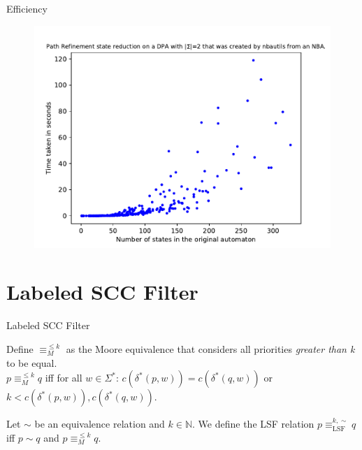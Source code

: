 \begin{frame}{Efficiency}
\begin{figure}
	\centering
	\includegraphics[page=6,height=.8\textheight]{../data/analysis/path_refinement/detnbaut_ap1.pdf} 
\end{figure}
\end{frame}





\section{Labeled SCC Filter}

\begin{frame}{Labeled SCC Filter}
\begin{defn}
	Define $\equiv_M^{\leq k}$ as the Moore equivalence that considers all priorities \emph{greater than k} to be equal. \\
	$p \equiv_M^{\leq k} q$ iff for all $w \in \Sigma^*$: $c(\delta^*(p, w)) = c(\delta^*(q, w))$ or $k < c(\delta^*(p, w)), c(\delta^*(q, w))$.
\end{defn}

\begin{defn}
	Let $\sim$ be an equivalence relation and $k \in \mathbb{N}$. We define the LSF relation $p \equiv^{k,\sim}_\text{LSF} q$ iff $p \sim q$ and $p \equiv_M^{\leq k} q$.
\end{defn}
\end{frame}


